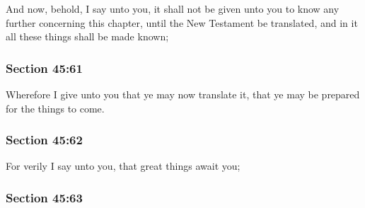 		And now, behold, I say unto you, it shall not be given unto you to know any further concerning this chapter, until the New Testament be translated, and in it all these things shall be made known;


	\subsubsection{Section 45:61} %
		\label{DC45-61}

		Wherefore I give unto you that ye may now translate it, that ye may be prepared for the things to come.


	\subsubsection{Section 45:62} %
		\label{DC45-62}

		For verily I say unto you, that great things await you;


	\subsubsection{Section 45:63} %
		\label{DC45-63}

